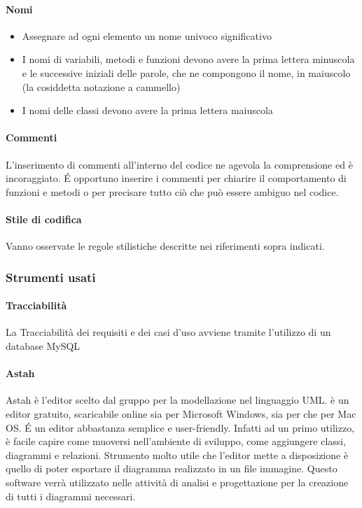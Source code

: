 \paragraph{Nomi}
\begin{itemize}
\item Assegnare ad ogni elemento un nome univoco significativo
\item I nomi di variabili, metodi e funzioni devono avere la prima lettera minuscola e  le successive iniziali delle parole, che ne compongono il nome, in maiuscolo (la cosiddetta notazione a cammello)
\item I nomi delle classi devono avere la prima lettera maiuscola
\end{itemize}

\paragraph{Commenti}

L'inserimento di commenti all'interno del codice ne agevola la
comprensione ed è incoraggiato. \'E opportuno inserire i commenti per chiarire il
comportamento di funzioni e metodi o per precisare tutto ciò che può essere ambiguo
nel codice.

\paragraph{Stile di codifica}
Vanno osservate le regole stilistiche descritte nei riferimenti sopra indicati.

\subsubsection{Strumenti usati}

\paragraph{Tracciabilità}

La Tracciabilità dei requisiti e dei casi d’uso avviene tramite l’utilizzo di un database MySQL

\paragraph{Astah}

Astah è l’editor scelto dal gruppo per la modellazione nel linguaggio UML.  è un editor
gratuito, scaricabile online sia per Microsoft Windows, sia per  che per Mac OS. \'E
un editor abbastanza semplice e user-friendly. Infatti ad un primo utilizzo, è facile capire come
muoversi nell’ambiente di sviluppo, come aggiungere classi, diagrammi e relazioni. Strumento
molto utile che l’editor mette a disposizione è quello di poter esportare il diagramma realizzato in
un file immagine. Questo software verrà utilizzato nelle attività di analisi e progettazione per la creazione
di tutti i diagrammi  necessari.


